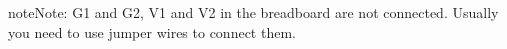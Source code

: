 \documentclass[a4paper,11pt,english]{sphinxmanual}
\begin{document}
\begin{sphinxadmonition}{note}{Note:}
\sphinxAtStartPar
G1 and G2, V1 and V2 in the breadboard are not connected. Usually you need to use jumper wires to connect them.
\end{sphinxadmonition}




\sphinxAtStartPar
{}

\end{document}
